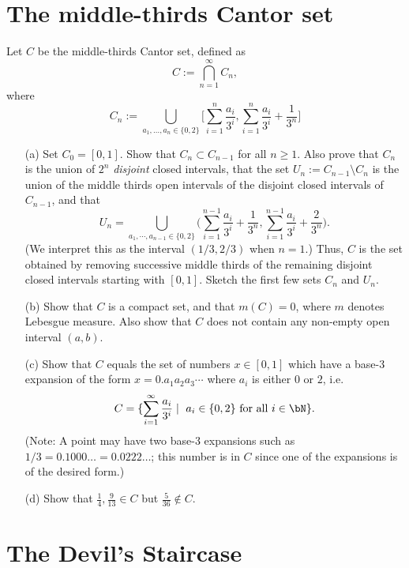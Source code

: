 \documentclass[lang=cn,11pt]{elegantbook}
\begin{document}
\section{The middle-thirds Cantor set}
  Let $C$ be the middle-thirds Cantor set, defined as
  \[
    C:=\bigcap_{n=1}^\infty C_n,
  \]
 where
\[
  C_n:=\bigcup_{a_1, \dots, a_n\in \{0,2\}} \big[\sum_{i=1}^n \frac{a_i}{3^i}, \sum_{i=1}^{n} \frac{a_i}{3^i} +\frac{1}{3^n} \big]
\]
\begin{itemize}
\item[(a)]
  Set $C_0=[0,1]$. Show that $C_n\subset C_{n-1}$ for all $n\ge1$.
  Also prove that $C_n$ is the union of $2^n$ \emph{disjoint} closed intervals, that the set  $U_n:=C_{n-1}\setminus C_n$ is the union of the middle thirds open intervals of the disjoint closed intervals of $C_{n-1}$, and that
\[
  U_n=\bigcup_{a_1, \cdots, a_{n-1}\in \{0,2\}} \big( \sum_{i=1}^{n-1} \frac{a_i}{3^i} + \frac{1}{3^n}, \sum_{i=1}^{n-1} \frac{a_i}{3^i} +\frac{2}{3^n} \big).
\]
(We interpret this as the interval $(1/3,2/3)$ when $n=1$.)
  Thus, $C$ is the set obtained by removing successive middle thirds of the remaining disjoint closed intervals starting with $[0,1]$. Sketch the first few sets $C_n$ and $U_n$.
\item[(b)]
  Show that $C$ is a compact set, and that $m(C)=0$, where $m$ denotes Lebesgue measure. Also show that $C$ does not contain any non-empty open interval $(a,b)$. 
\item[(c)]
  Show that $C$ equals the set of numbers $x\in [0,1]$ which have a base-3 expansion of the form
  $x=0.a_1a_2a_3\cdots$ where $a_i$ is either $0$ or $2$, i.e.\
  \[
    C=\{ \sum_{i=1}^\infty \frac{a_i}{3^i} \mid \text{ $a_i\in \{0,2\}$ for all $i\in \bN$} \}.
  \]
  (Note: A point may have two base-3 expansions such as $1/3=0.1000\ldots=0.0222\ldots$; this number is in $C$ since one of the expansions is of the desired form.) 
\item[(d)]
  Show that $\frac14, \frac9{13}\in C$ but $\frac{5}{36}\notin C$.
\end{itemize}

\section{The Devil's Staircase}
\end{document}

